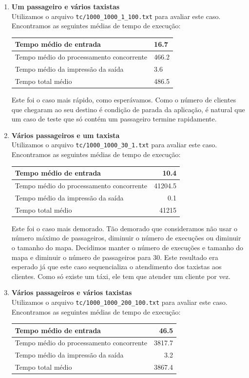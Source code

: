 \documentclass[a4paper,landscape,12pt]{article}
\begin{document}
\begin{enumerate}
\item \textbf{Um passageiro e vários taxistas} \\
Utilizamos o arquivo \texttt{tc/1000\_1000\_1\_100.txt} para avaliar este caso. Encontramos as seguintes médias de tempo de execução:

\begin{tabular}{|ll|}
\hline
Tempo médio de entrada & 16.7 \\ \hline
Tempo médio do processamento concorrente & 466.2 \\ \hline
Tempo médio da impressão da saída & 3.6 \\ \hline
Tempo total médio & 486.5 \\ \hline
\end{tabular}

Este foi o caso mais rápido, como esperávamos. Como o número de clientes que chegaram ao seu destino é condição de parada da aplicação, é natural que um caso de teste que só contém um passageiro termine rapidamente.

\item \textbf{Vários passageiros e um taxista} \\
Utilizamos o arquivo \texttt{tc/1000\_1000\_30\_1.txt} para avaliar este caso. Encontramos as seguintes médias de tempo de execução:

\begin{tabular}{|lr|}
\hline
Tempo médio de entrada & 10.4 \\ \hline
Tempo médio do processamento concorrente & 41204.5 \\ \hline
Tempo médio da impressão da saída & 0.1 \\ \hline
Tempo total médio & 41215 \\ \hline
\end{tabular}

Este foi o caso mais demorado. Tão demorado que consideramos não usar o número máximo de passageiros, diminuir o número de execuções ou diminuir o tamanho do mapa. Decidimos manter o número de execuções e tamanho do mapa e diminuir o número de passageiros para 30. Este resultado era esperado já que este caso sequencializa o atendimento dos taxistas aos clientes. Como só existe um táxi, ele tem que atender um cliente por vez.

\item \textbf{Vários passageiros e vários taxistas} \\
Utilizamos o arquivo \texttt{tc/1000\_1000\_200\_100.txt} para avaliar este caso. Encontramos as seguintes médias de tempo de execução:

\begin{tabular}{|lr|}
\hline
Tempo médio de entrada & 46.5 \\ \hline
Tempo médio do processamento concorrente & 3817.7 \\ \hline
Tempo médio da impressão da saída & 3.2 \\ \hline
Tempo total médio & 3867.4 \\ \hline
\end{tabular}

\end{enumerate}
\end{document}
